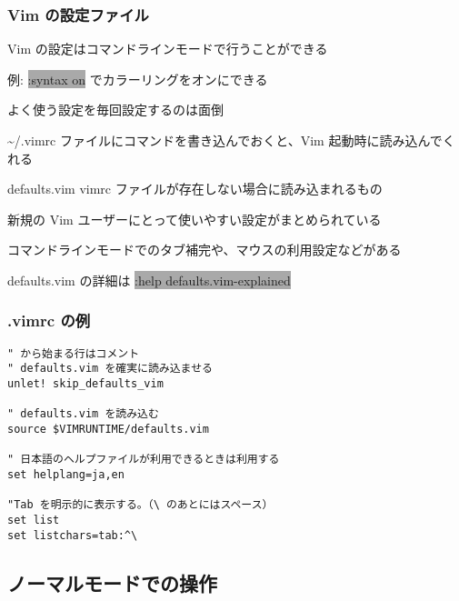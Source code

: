\documentclass[unicode,aspectratio=1610,colorlinks,handout]{beamer}
\newcommand{\typecommand}[1]{\colorbox{darkgray}{{\ttfamily\color{lime}#1}}}
\begin{document}
\begin{frame}
	\frametitle{Vim の設定ファイル}
	Vim の設定はコマンドラインモードで行うことができる
	
	例: \typecommand{:syntax on} でカラーリングをオンにできる
	
	よく使う設定を毎回設定するのは面倒
	
	\textasciitilde/.vimrc ファイルにコマンドを書き込んでおくと、Vim 起動時に読み込んでくれる
	
	\begin{block}{defaults.vim}
		vimrc ファイルが存在しない場合に読み込まれるもの
		
		新規の Vim ユーザーにとって使いやすい設定がまとめられている
		
		コマンドラインモードでのタブ補完や、マウスの利用設定などがある
		
		defaults.vim の詳細は \typecommand{:help defaults.vim-explained}
	\end{block}
\end{frame}

\begin{frame}[fragile]
	\frametitle{.vimrc の例}
	\begin{lstlisting}
" から始まる行はコメント
" defaults.vim を確実に読み込ませる
unlet! skip_defaults_vim

" defaults.vim を読み込む
source $VIMRUNTIME/defaults.vim

" 日本語のヘルプファイルが利用できるときは利用する
set helplang=ja,en

"Tab を明示的に表示する。（\ のあとにはスペース）
set list
set listchars=tab:^\ 
	\end{lstlisting}
\end{frame}

\begin{frame}
	\section{ノーマルモードでの操作}
\end{frame}
\end{document}
